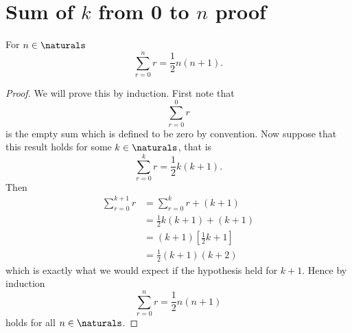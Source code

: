 \section{Sum of \texorpdfstring{\(k\)}{k} from 0 to \texorpdfstring{\(n\)}{n} proof}\label{sec:proof sum 0 to n of r is 0.5 n(n+1)}
    \begin{theorem}
        For \(n \in \naturals\)
        \[\sum_{r=0}^{n} r = \frac{1}{2}n(n + 1).\]
    \end{theorem}
    \begin{proof}
        We will prove this by induction.
        First note that
        \[\sum_{r=0}^{0}r\]
        is the empty sum which is defined to be zero by convention.
        Now suppose that this result holds for some \(k \in \naturals\), that is
        \[\sum_{r = 0}^{k} r = \frac{1}{2}k(k + 1).\]
        Then
        \begin{align*}
            \sum_{r = 0}^{k + 1} r &= \sum_{r = 0}^{k} r + (k + 1)\\
            &= \frac{1}{2}k(k + 1) + (k + 1)\\
            &= (k + 1)\left[\frac{1}{2}k + 1\right]\\
            &= \frac{1}{2}(k + 1)(k + 2)
        \end{align*}
        which is exactly what we would expect if the hypothesis held for \(k + 1\).
        Hence by induction
        \[\sum_{r=0}^{n} r = \frac{1}{2}n(n + 1)\]
        holds for all \(n\in\naturals\).
    \end{proof}